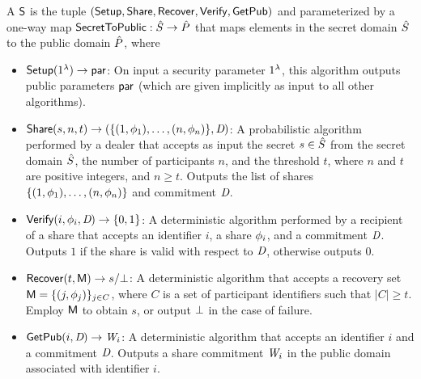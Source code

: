 \begin{definition} \label{defn:vss}
  A  $\mathsf{S}$ is the tuple
  $(\mathsf{Setup}, \allowbreak \mathsf{Share}, \allowbreak \mathsf{Recover}, \mathsf{Verify}, \mathsf{GetPub})$
  and parameterized by a one-way map $\mathsf{SecretToPublic} : \hat{S} \rightarrow \hat{P}$ that maps elements in the secret domain $\hat{S}$ to the public domain $\hat{P}$,
  where
  \begin{itemize}
    \item $\mathsf{Setup}(1^\lambda) \rightarrow \mathsf{par}$:
    On input a security parameter $1^\lambda$, this algorithm outputs public parameters $\mathsf{par}$ (which are given implicitly as input to all other algorithms).
    \item $\mathsf{Share}(s, n, t) \rightarrow (\{ (1, \phi_1), \ldots, (n, \phi_n)\}, \textit{D})$:
      A probabilistic algorithm performed by a dealer that accepts as input
      the secret $s \in \hat{S}$ from the secret domain $\hat{S}$,
      the number of participants $n$, and the threshold $t$,
      where $n$ and $t$ are positive integers, and $n \geq t$.
      Outputs the list of shares $\{ (1, \phi_1), \ldots, (n, \phi_n) \}$
      and commitment $\textit{D}$.
    \item $\mathsf{Verify}(i, \phi_i, \textit{D}) \rightarrow \{ 0, 1\}$:
      A deterministic algorithm performed by a recipient of a share that accepts
      an identifier $i$,
      a share $\phi_i$,
      and a commitment $\textit{D}$.
      Outputs $1$ if the share is valid with respect to $\textit{D}$, otherwise outputs $0$.
    \item $\mathsf{Recover}(t, \mathsf{M}) \rightarrow s/\bot$:
      A deterministic algorithm that accepts a recovery set $\mathsf{M} = \{ (j, \phi_j)\}_{j \in C}$,
      where $C$ is a set of participant identifiers such that $\lvert C \rvert \geq t$.
      Employ $\mathsf{M}$ to obtain $s$,
      or output $\bot$ in the case of failure.
    \item $\mathsf{GetPub}(i, \textit{D}) \rightarrow \textit{W}_i$:
      A deterministic algorithm that accepts an identifier $i$ and a commitment $\textit{D}$.
      Outputs a share commitment $\textit{W}_i$ in the public domain associated with identifier $i$.
  \end{itemize}
\end{definition}


